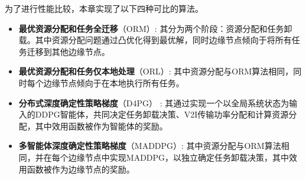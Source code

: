 \begin{table}[h]\small
\centering
{}
\label{table 4-2}
\end{table}
 
为了进行性能比较，本章实现了以下四种可比的算法。
\begin{itemize}
	\item \textbf{最优资源分配和任务全迁移}（ORM）: 其分为两个阶段：资源分配和任务卸载。其中资源分配问题通过凸优化得到最优解，同时边缘节点倾向于将所有任务迁移到其他边缘节点。
	\item \textbf{最优资源分配和任务仅本地处理}（ORL）: 其中资源分配与ORM算法相同，同时每个边缘节点倾向于在本地执行所有任务。
	\item \textbf{分布式深度确定性策略梯度}（D4PG） \cite{barth2018distributed}: 其通过实现一个以全局系统状态为输入的DDPG智能体，共同决定任务卸载决策、V2I传输功率分配和计算资源分配，其中效用函数被作为智能体的奖励。
	\item \textbf{多智能体深度确定性策略梯度}（MADDPG）\cite{zhang2021adaptive}: 其中资源分配与ORM算法相同，并在每个边缘节点中实现MADDPG，以独立确定任务卸载决策，其中效用函数被作为边缘节点的奖励。
\end{itemize}

